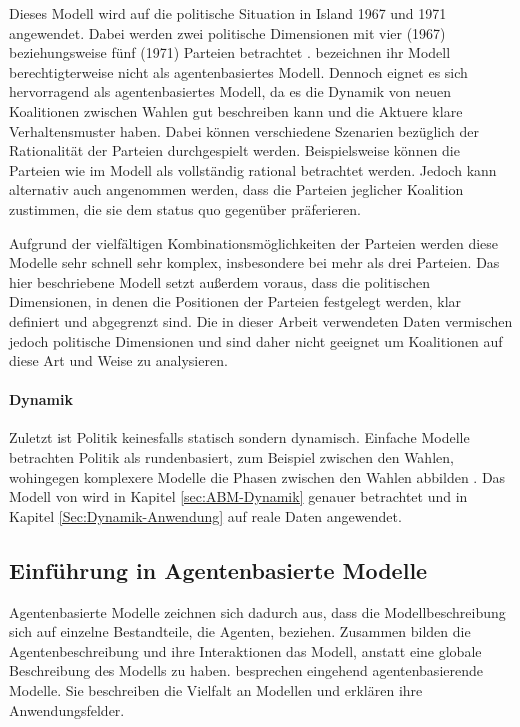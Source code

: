 Dieses Modell wird auf die politische Situation in Island 1967 und 1971 angewendet. Dabei werden zwei politische Dimensionen mit vier (1967) beziehungsweise fünf (1971) Parteien betrachtet \citep[S.\,882-885]{laver1990coalitions}. \citet{laver1990coalitions} bezeichnen ihr Modell berechtigterweise nicht als agentenbasiertes Modell. Dennoch eignet es sich hervorragend als agentenbasiertes Modell, da es die Dynamik von neuen Koalitionen zwischen Wahlen gut beschreiben kann und die Aktuere klare Verhaltensmuster haben. Dabei können verschiedene Szenarien bezüglich der Rationalität der Parteien durchgespielt werden. Beispielsweise können die Parteien wie im Modell als vollständig rational betrachtet werden. Jedoch kann alternativ auch angenommen werden, dass die Parteien jeglicher Koalition zustimmen, die sie dem status quo gegenüber präferieren.

Aufgrund der vielfältigen Kombinationsmöglichkeiten der Parteien werden diese Modelle sehr schnell sehr komplex, insbesondere bei mehr als drei Parteien.
Das hier beschriebene Modell setzt außerdem voraus, dass die politischen Dimensionen, in denen die Positionen der Parteien festgelegt werden, klar definiert und abgegrenzt sind.
Die in dieser Arbeit verwendeten Daten vermischen jedoch politische Dimensionen und sind daher nicht geeignet um Koalitionen auf diese Art und Weise zu analysieren.

\paragraph{Dynamik}
Zuletzt ist Politik keinesfalls statisch sondern dynamisch. Einfache Modelle betrachten Politik als rundenbasiert, zum Beispiel zwischen den Wahlen, wohingegen komplexere Modelle die Phasen zwischen den Wahlen abbilden \citep[S.\,263-264]{laver2005policy}.
Das Modell von \citet{laver2005policy} wird in Kapitel \ref{sec:ABM-Dynamik} genauer betrachtet und in Kapitel \ref{Sec:Dynamik-Anwendung} auf reale Daten angewendet.

\subsection{Einführung in Agentenbasierte Modelle}

Agentenbasierte Modelle zeichnen sich dadurch aus, dass die Modellbeschreibung sich auf einzelne Bestandteile, die Agenten, beziehen. Zusammen bilden die Agentenbeschreibung und ihre Interaktionen das Modell, anstatt eine globale Beschreibung des Modells zu haben. \citet{marchi2014ABMs} besprechen eingehend agentenbasierende Modelle. Sie beschreiben die Vielfalt an Modellen und erklären ihre Anwendungsfelder.

